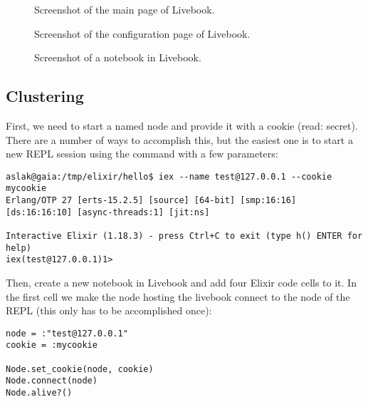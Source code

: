 \begin{figure}[tbp]
  
  \caption{Screenshot of the main page of Livebook.}
  \label{fig:first:elixir:livebook:main}
\end{figure}


\begin{figure}[tbp]
  
  \caption{Screenshot of the configuration page of Livebook.}
  \label{fig:first:elixir:livebook:config}
\end{figure}


\begin{figure}[tbp]
  
  \caption{Screenshot of a notebook in Livebook.}
  \label{fig:first:elixir:livebook:notebook}
\end{figure}

\subsection{Clustering}


First, we need to start a named node and provide it with a cookie (read: secret). There are a number of ways to accomplish this, but the easiest one is to start a new REPL session using the  command with a few parameters:

\begin{verbatim}
aslak@gaia:/tmp/elixir/hello$ iex --name test@127.0.0.1 --cookie mycookie 
Erlang/OTP 27 [erts-15.2.5] [source] [64-bit] [smp:16:16] [ds:16:16:10] [async-threads:1] [jit:ns]

Interactive Elixir (1.18.3) - press Ctrl+C to exit (type h() ENTER for help)
iex(test@127.0.0.1)1>
\end{verbatim}

Then, create a new notebook in Livebook and add four Elixir code cells to it. In the first cell we make the node hosting the livebook connect to the node of the REPL (this only has to be accomplished once):

\begin{verbatim}
node = :"test@127.0.0.1"
cookie = :mycookie

Node.set_cookie(node, cookie)
Node.connect(node)
Node.alive?()
\end{verbatim}

